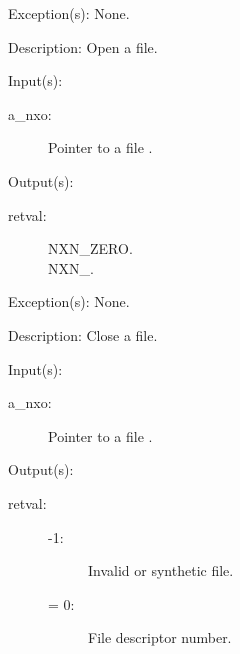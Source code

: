 \begin{capi}
\begin{capilist}
	\item[Exception(s): ] None.
	\item[Description: ]
		Open a file.
	\end{capilist}
\label{nxo_file_close}
	\begin{capilist}
	\item[Input(s): ]
		\begin{description}\item[]
		\item[a\_nxo: ]
			Pointer to a file .
		\end{description}
	\item[Output(s): ]
		\begin{description}\item[]
		\item[retval: ]
			\begin{description}\item[]
			\item[NXN\_ZERO.]
			\item[NXN\_.]
			\end{description}
		\end{description}
	\item[Exception(s): ] None.
	\item[Description: ]
		Close a file.
	\end{capilist}
\label{nxo_file_fd_get}
	\begin{capilist}
	\item[Input(s): ]
		\begin{description}\item[]
		\item[a\_nxo: ]
			Pointer to a file \classname{nxo}.
		\end{description}
	\item[Output(s): ]
		\begin{description}\item[]
		\item[retval: ]
			\begin{description}\item[]
			\item[-1: ]
				Invalid or synthetic file.
			\item[{\gt}= 0: ]
				File descriptor number.
			\end{description}

\end{description}
\end{capilist}
\end{capi}
